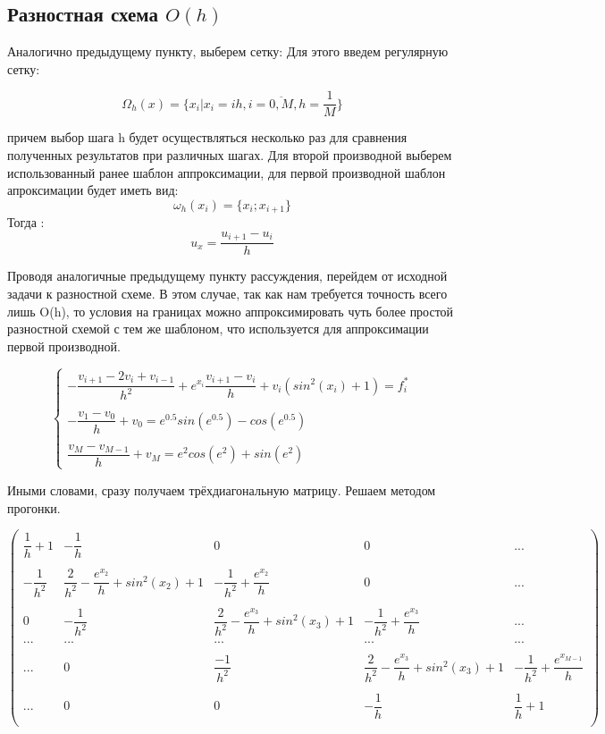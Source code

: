 \documentclass[12pt]{article}
\begin{document}
\subsection{Разностная схема $O(h)$}

Аналогично предыдущему пункту, выберем сетку:
Для этого введем регулярную сетку:

$$
\Omega_h(x) = \{x_i | x_i = ih, i = \overline{0, M}, h = \dfrac{1}{M}\}
$$

причем выбор шага h будет осуществляться несколько раз для сравнения полученных результатов при различных шагах.
Для второй производной выберем использованный ранее шаблон аппроксимации, для первой производной шаблон апроксимации будет иметь вид:
$$
\omega_h(x_i) = \{ x_{i}; x_{i + 1}\}
$$
Тогда :
$$
u_x = \dfrac{u_{i + 1} - u_{i}}{h}
$$

Проводя аналогичные предыдущему пункту рассуждения, перейдем от исходной задачи к разностной схеме. В этом случае, так как нам требуется точность всего лишь O(h), то условия на границах можно аппроксимировать чуть более простой разностной схемой с тем же шаблоном, что используется для аппроксимации первой производной.

$$
\begin{cases}
- \dfrac{v_{i+1} - 2v_i + v_{i - 1}}{h^2} + e^{x_i}\dfrac{v_{i+1} - v_i}{h} + v_i(sin^2(x_i) + 1) = f_i^* \\
\\
- \dfrac{v_1 - v_0}{h} + v_0 = e^{0.5}sin(e^{0.5}) - cos(e^{0.5}) \\
\\
\dfrac{v_M - v_{M-1}}{h} + v_M = e^2cos(e^2) + sin(e^2)
\end{cases}
$$


Иными словами, сразу получаем трёхдиагональную матрицу. Решаем методом прогонки.

$$
\begin{pmatrix}
	\dfrac{1}{h} + 1& -\dfrac{1}{h} &  0 & 0 & ... \\
	\\
	-\dfrac{1}{h^2}  & \dfrac{2}{h^2} - \dfrac{e^{x_2}}{h} + sin^2(x_2) + 1 & -\dfrac{1}{h^2} + \dfrac{e^{x_2}}{h} & 0 & ... \\
	\\
	0 & -\dfrac{1}{h^2} & \dfrac{2}{h^2} - \dfrac{e^{x_3}}{h} + sin^2(x_3) + 1 &
	 -\dfrac{1}{h^2} + \dfrac{e^{x_3}}{h} & ... \\
	... & ... & ... & ... & ... \\
	\\
	... & 0 & \dfrac{-1}{h^2} & \dfrac{2}{h^2} - \dfrac{e^{x_3}}{h} + sin^2(x_3) + 1 &
	 -\dfrac{1}{h^2} + \dfrac{e^{x_{M-1}}}{h} \\
	\\
	... & 0 & 0 & -\dfrac{1}{h} & \dfrac{1}{h} + 1\\
\end{pmatrix}
$$
\newpage
\end{document}
